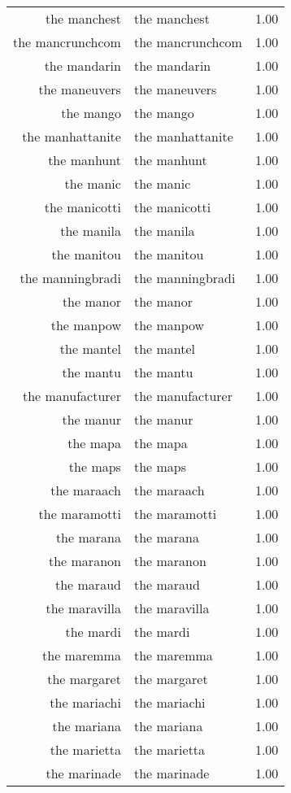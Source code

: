 \begin{table}[ht]
\begin{tabular}{rlr}
  the manchest & the manchest & 1.00 \\ 
  the mancrunchcom & the mancrunchcom & 1.00 \\ 
  the mandarin & the mandarin & 1.00 \\ 
  the maneuvers & the maneuvers & 1.00 \\ 
  the mango & the mango & 1.00 \\ 
  the manhattanite & the manhattanite & 1.00 \\ 
  the manhunt & the manhunt & 1.00 \\ 
  the manic & the manic & 1.00 \\ 
  the manicotti & the manicotti & 1.00 \\ 
  the manila & the manila & 1.00 \\ 
  the manitou & the manitou & 1.00 \\ 
  the manningbradi & the manningbradi & 1.00 \\ 
  the manor & the manor & 1.00 \\ 
  the manpow & the manpow & 1.00 \\ 
  the mantel & the mantel & 1.00 \\ 
  the mantu & the mantu & 1.00 \\ 
  the manufacturer & the manufacturer & 1.00 \\ 
  the manur & the manur & 1.00 \\ 
  the mapa & the mapa & 1.00 \\ 
  the maps & the maps & 1.00 \\ 
  the maraach & the maraach & 1.00 \\ 
  the maramotti & the maramotti & 1.00 \\ 
  the marana & the marana & 1.00 \\ 
  the maranon & the maranon & 1.00 \\ 
  the maraud & the maraud & 1.00 \\ 
  the maravilla & the maravilla & 1.00 \\ 
  the mardi & the mardi & 1.00 \\ 
  the maremma & the maremma & 1.00 \\ 
  the margaret & the margaret & 1.00 \\ 
  the mariachi & the mariachi & 1.00 \\ 
  the mariana & the mariana & 1.00 \\ 
  the marietta & the marietta & 1.00 \\ 
  the marinade & the marinade & 1.00 \\ 

\end{tabular}
\end{table}
